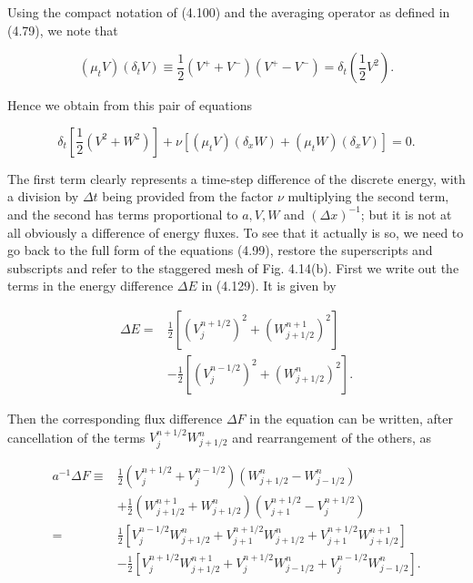 \documentclass[10pt]{article}
\begin{document}
Using the compact notation of (4.100) and the averaging operator as defined in (4.79), we note that

\[
\left(\mu_{t} V\right)\left(\delta_{t} V\right) \equiv \frac{1}{2}\left(V^{+}+V^{-}\right)\left(V^{+}-V^{-}\right)=\delta_{t}\left(\frac{1}{2} V^{2}\right) .
\]

Hence we obtain from this pair of equations

\[
\delta_{t}\left[\frac{1}{2}\left(V^{2}+W^{2}\right)\right]+\nu\left[\left(\mu_{t} V\right)\left(\delta_{x} W\right)+\left(\mu_{t} W\right)\left(\delta_{x} V\right)\right]=0 .
\]

The first term clearly represents a time-step difference of the discrete energy, with a division by \(\Delta t\) being provided from the factor \(\nu\) multiplying the second term, and the second has terms proportional to \(a, V, W\) and \((\Delta x)^{-1}\); but it is not at all obviously a difference of energy fluxes. To see that it actually is so, we need to go back to the full form of the equations (4.99), restore the superscripts and subscripts and refer to the staggered mesh of Fig. 4.14(b). First we write out the terms in the energy difference \(\Delta E\) in (4.129). It is given by

\[
\begin{aligned}
\Delta E= & \frac{1}{2}\left[\left(V_{j}^{n+1 / 2}\right)^{2}+\left(W_{j+1 / 2}^{n+1}\right)^{2}\right] \\
& -\frac{1}{2}\left[\left(V_{j}^{n-1 / 2}\right)^{2}+\left(W_{j+1 / 2}^{n}\right)^{2}\right] .
\end{aligned}
\]

Then the corresponding flux difference \(\Delta F\) in the equation can be written, after cancellation of the terms \(V_{j}^{n+1 / 2} W_{j+1 / 2}^{n}\) and rearrangement of the others, as

\[
\begin{aligned}
a^{-1} \Delta F \equiv & \frac{1}{2}\left(V_{j}^{n+1 / 2}+V_{j}^{n-1 / 2}\right)\left(W_{j+1 / 2}^{n}-W_{j-1 / 2}^{n}\right) \\
& +\frac{1}{2}\left(W_{j+1 / 2}^{n+1}+W_{j+1 / 2}^{n}\right)\left(V_{j+1}^{n+1 / 2}-V_{j}^{n+1 / 2}\right) \\
= & \frac{1}{2}\left[V_{j}^{n-1 / 2} W_{j+1 / 2}^{n}+V_{j+1}^{n+1 / 2} W_{j+1 / 2}^{n}+V_{j+1}^{n+1 / 2} W_{j+1 / 2}^{n+1}\right] \\
& -\frac{1}{2}\left[V_{j}^{n+1 / 2} W_{j+1 / 2}^{n+1}+V_{j}^{n+1 / 2} W_{j-1 / 2}^{n}+V_{j}^{n-1 / 2} W_{j-1 / 2}^{n}\right] .
\end{aligned}
\]
\end{document}
